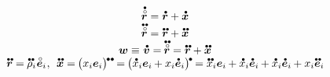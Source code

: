 \begin{otherlanguage}{russian}
\begin{equation*}
\begin{array}{c}
\mathdotabove{\initiallocationvector} = \mathdotabove{\locationvector} + \mathdotabove{\bm{x}}
\\
\mathdotdotabove{\initiallocationvector} = \mathdotdotabove{\locationvector} + \mathdotdotabove{\bm{x}}
\\
\bm{w} \equiv \hspace{.1ex} \mathdotabove{\bm{v}} = \hspace{-0.15ex} \mathdotdotabove{\initiallocationvector} = \mathdotdotabove{\locationvector} + \mathdotdotabove{\bm{x}}
\\
\mathdotdotabove{\locationvector} = \hspace{-0.1ex}
\mathdotdotabove{\rho}_i \hspace{.1ex} \mathcircabove{\bm{e}}_i
\hspace{.1ex} , \:\:
\mathdotdotabove{\bm{x}} = \hspace{-0.15ex} \bigl( x_i \bm{e}_i \bigr)^{ \hspace{-0.15ex} \tikz[baseline=-0.2ex] \draw[black, fill=black] (0,0) circle (.28ex); \hspace{.2ex} \tikz[baseline=-0.2ex] \draw[black, fill=black] (0,0) circle (.28ex); } \hspace{-0.2ex}
= \hspace{-0.15ex} \bigl( \mathdotabove{x}_i \bm{e}_i \hspace{-0.1ex} + x_i \mathdotabove{\bm{e}}_i \bigr)^{ \hspace{-0.15ex} \tikz[baseline=-0.2ex] \draw[black, fill=black] (0,0) circle (.28ex); } \hspace{-0.15ex}
= \mathdotdotabove{x}_i \bm{e}_i \hspace{-0.1ex} + \mathdotabove{x}_i \mathdotabove{\bm{e}}_i \hspace{-0.1ex}
+ \mathdotabove{x}_i \mathdotabove{\bm{e}}_i \hspace{-0.1ex} + x_i \mathdotdotabove{\bm{e}}_i \hspace{-0.1ex}
\end{array}
\end{equation*}


\end{otherlanguage}
